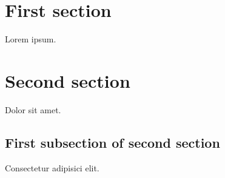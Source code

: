 \documentclass{article}
\begin{document}
\section{First section}

Lorem ipsum.

\section{Second section}

Dolor sit amet.

\subsection{First subsection of second section}

Consectetur adipisici elit.


\end{document}
